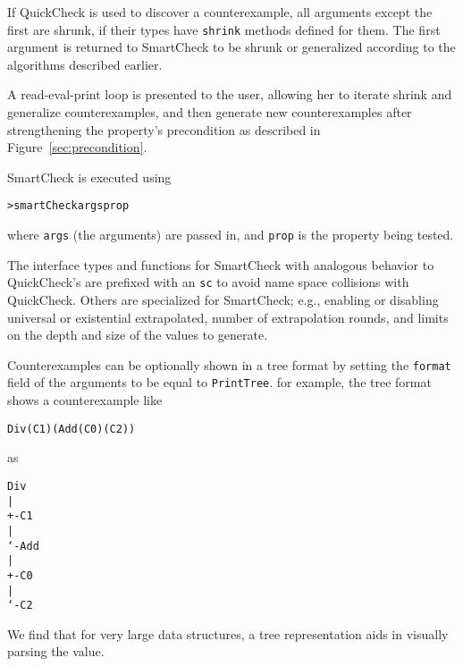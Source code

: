 \documentclass{sigplanconf}
\newenvironment{code}{\begin{alltt}\footnotesize}{\end{alltt}}
\newcommand{\ttp}[1]{\texttt{#1}}
\begin{document}
If QuickCheck is used to discover a counterexample, all arguments except the
first are shrunk, if their types have \ttp{shrink} methods defined for them.
The first argument is returned to SmartCheck to be shrunk or generalized
according to the algorithms described earlier.


A read-eval-print loop is presented to the user, allowing her to iterate shrink
and generalize counterexamples, and then generate new counterexamples after
strengthening the property's precondition as described in
Figure~\ref{sec:precondition}.

SmartCheck is executed using
%
\begin{code}
> smartCheck args prop
\end{code}
%
\noindent
where \ttp{args} (the arguments) are passed in, and \ttp{prop} is the property
being tested.

The interface types and functions for SmartCheck with analogous behavior to
QuickCheck's are prefixed with an \ttp{sc} to avoid name space collisions with
QuickCheck.  Others are specialized for SmartCheck; e.g., enabling or disabling
universal or existential extrapolated, number of extrapolation rounds, and
limits on the depth and size of the values to generate.

Counterexamples can be optionally shown in a tree format by setting the
\ttp{format} field of the arguments to be equal to \ttp{PrintTree}.  for
example, the tree format shows a counterexample like
%
\begin{code}
Div (C 1) (Add (C 0) (C 2))
\end{code}
%
\noindent
as
%
\begin{samepage}
\begin{code}
Div
|
+- C 1
|
`- Add
   |
   +- C 0
   |
   `- C 2
\end{code}
\end{samepage}
%
\noindent
We find that for very large data structures, a tree representation
aids in visually parsing the value.
\end{document}
